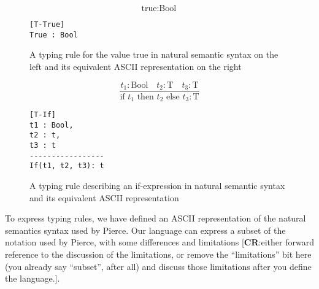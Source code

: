 \documentclass[nofilelist]{cslthse-msc}
\newcommand{\CR}[1]{\textcolor{green!60!black}{[\textbf{CR}:#1]}}
\begin{document}
\begin{figure}[h]
\centering
\begin{minipage}{.45\textwidth}
  \centering
  \begin{equation}
    \tag{T-True}
    \text{true} : \text{Bool}
  \end{equation}
\end{minipage}%
\hspace{.1\textwidth}\begin{minipage}{.45\textwidth}
  \centering
\begin{lstlisting}[]
[T-True]
True : Bool
\end{lstlisting}
\end{minipage}
\caption{A typing rule for the value true in natural semantic syntax on the left and its equivalent ASCII representation on the right}
\label{trexampletrue}
\end{figure}
\begin{figure}[h]
\centering
\begin{minipage}{.45\textwidth}
  \centering
  \begin{equation}
    \tag{T-If}
    \frac{
      t_1 : \text{Bool}\quad
      t_2 : \text{T}\quad
      t_3 : \text{T}
    }{
      \text{if } t_1 \text{ then } t_2 \text{ else } t_3 : \text{T}
    }
  \end{equation}
\end{minipage}%
\hspace{.1\textwidth}\begin{minipage}{.45\textwidth}
  \centering
\begin{lstlisting}[]
[T-If]
t1 : Bool,
t2 : t,
t3 : t
-----------------
If(t1, t2, t3): t
\end{lstlisting}
\end{minipage}
\caption{A typing rule describing an if-expression in natural semantic syntax and its equivalent ASCII representation}
\label{trexampleif}
\end{figure}


To express typing rules, we have defined an ASCII representation of the natural semantics syntax used by Pierce\cite{pierce}.
Our language can express a subset of the notation used by Pierce, with some differences and limitations
\CR{either forward reference to the discussion of the limitations, or remove the ``limitations'' bit here (you already say ``subset'', after all) and discuss those limitations after you define the language.}.
\end{document}
